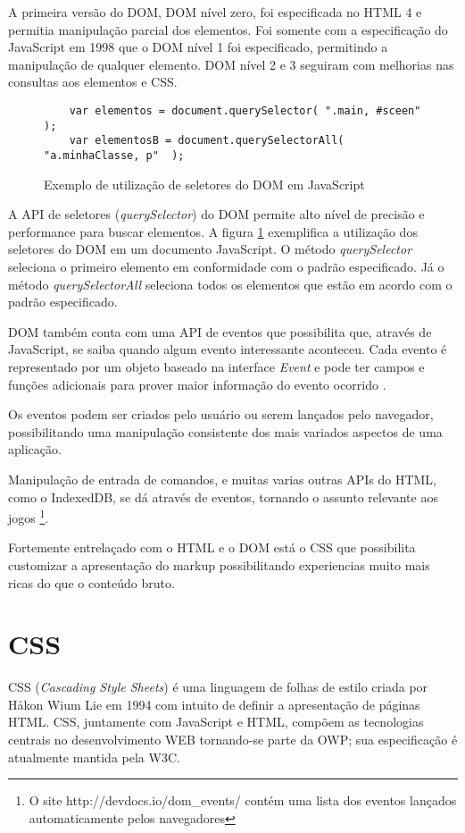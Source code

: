 A primeira versão do DOM, DOM nível zero, foi especificada no
HTML 4 e permitia manipulação parcial dos elementos. Foi somente
com a especificação do JavaScript em 1998 que o DOM nível 1 foi
especificado, permitindo a manipulação de qualquer elemento. DOM
nível 2 e 3 seguiram com melhorias nas consultas aos elementos e CSS.

\begin{figure}[H]
\centering
\begin{verbatim}
    var elementos = document.querySelector( ".main, #sceen"  );
    var elementosB = document.querySelectorAll( "a.minhaClasse, p"  );
\end{verbatim}
\caption{Exemplo de utilização de seletores do DOM em JavaScript}
\label{fig:selectorsSample}
\end{figure}

A API de seletores (\textit{querySelector}) do DOM permite alto
nível de precisão e performance para buscar elementos. A figura
\ref{fig:selectorsSample} exemplifica a utilização dos seletores
do DOM em um documento JavaScript. O método \textit{querySelector}
seleciona o primeiro elemento em conformidade com o padrão
especificado. Já o método \textit{querySelectorAll} seleciona todos os
elementos que estão em acordo com o padrão especificado.

DOM também conta com uma API de eventos que possibilita que, através
de JavaScript, se saiba quando algum evento interessante aconteceu.
Cada evento é representado por um objeto baseado na interface
\textit{Event} e pode ter campos e funções adicionais para prover
maior informação do evento ocorrido \autocite{devdocs}.

Os eventos podem ser criados pelo usuário ou serem lançados pelo
navegador, possibilitando uma manipulação consistente dos mais
variados aspectos de uma aplicação.

Manipulação de entrada de comandos, e muitas varias outras APIs do
HTML, como o IndexedDB, se dá através de eventos, tornando o assunto
relevante aos jogos \footnote{O site http://devdocs.io/dom\_events/
contém uma lista dos eventos lançados automaticamente pelos
navegadores}.

Fortemente entrelaçado com o HTML e o DOM está o CSS que possibilita
customizar a apresentação do markup possibilitando experiencias muito
mais ricas do que o conteúdo bruto.
\section{CSS}
CSS (\textit{Cascading Style Sheets}) é uma linguagem de folhas de
estilo criada por Håkon Wium Lie em 1994 com intuito de definir a
apresentação de páginas HTML. CSS, juntamente com JavaScript e HTML,
compõem as tecnologias centrais no desenvolvimento WEB tornando-se
parte da OWP; sua especificação é atualmente mantida pela W3C.

